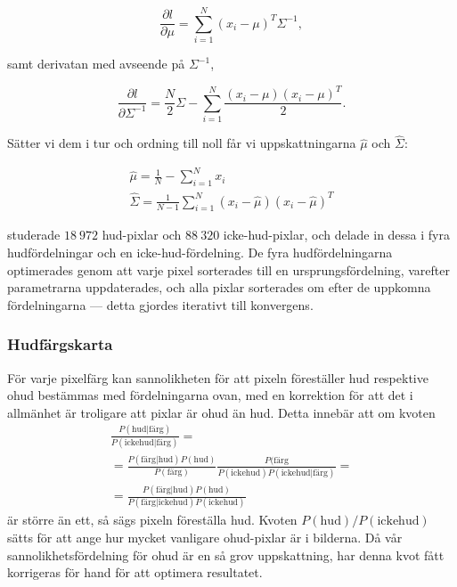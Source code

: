 \documentclass[../rapport_MVEX01-11-05]{subfiles}
\begin{document}
\begin{equation*}
  \frac{\partial l}{\partial \mu}=\sum_{i=1}^N(x_i-\mu)^T\Sigma^{-1},
\end{equation*}

samt derivatan med avseende på $\Sigma^{-1}$,

\begin{equation*}
  \frac{\partial l}{\partial \Sigma^{-1}}=\frac{N}{2}\Sigma
  -\sum_{i=1}^N\frac{(x_i-\mu)(x_i-\mu)^T}{2}.
\end{equation*}

Sätter vi dem i tur och ordning till noll får vi uppskattningarna $\hat\mu$ och $\hat\Sigma$:


\begin{gather*}
  \hat\mu    =\frac{1}{N}-\sum_{i=1}^Nx_i\\
  \hat\Sigma =\frac{1}{N-1}\sum_{i=1}^N(x_i-\hat\mu)(x_i-\hat\mu)^T
\end{gather*}

 studerade $18\:972$
hud-pixlar och $88\:320$ icke-hud-pixlar, och delade in dessa i fyra
hudfördelningar och en icke-hud-fördelning. De fyra hudfördelningarna
optimerades genom att varje pixel sorterades till en
ursprungsfördelning, varefter parametrarna uppdaterades, och alla
pixlar sorterades om efter de uppkomna fördelningarna --- detta gjordes
iterativt till konvergens.


\subsubsection{Hudfärgskarta}

För varje pixelfärg kan sannolikheten för att pixeln föreställer hud
respektive ohud bestämmas med fördelningarna ovan, med en korrektion
för att det i allmänhet är troligare att pixlar är ohud än hud. Detta
innebär att om kvoten
\begin{multline*}
\frac{P(\textrm{hud}|\textrm{färg})}{P(\textrm{ickehud}|\textrm{färg})}=\\
=\frac{P(\textrm{färg}|\textrm{hud})P(\textrm{hud})}{P(\textrm{färg})}
 \frac{P(\textrm{färg}}{P(\textrm{ickehud})P(\textrm{ickehud}|\textrm{färg})}=\\
=\frac{P(\textrm{färg}|\textrm{hud})P(\textrm{hud})}{P(\textrm{färg}|\textrm{ickehud})
 P(\textrm{ickehud})}
\end{multline*}
är större än ett, så sägs pixeln föreställa hud. Kvoten
$P(\textrm{hud})/P(\textrm{ickehud})$ sätts för att ange hur mycket vanligare ohud-pixlar
är i bilderna. Då vår sannolikhetsfördelning för ohud är en så grov
uppskattning, har denna kvot fått korrigeras för hand för att optimera
resultatet.
\end{document}
